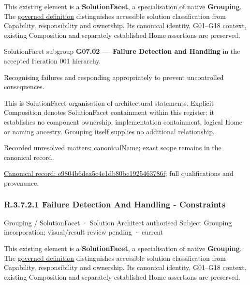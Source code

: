 This existing element is a \textbf{SolutionFacet}, a specialisation of native
\textbf{Grouping}. The \href{\detokenize{../../../../../../../governance/continuum-representation.md#solutionfacet-classification--1119-candidate}}{governed definition}
distinguishes accessible solution classification from Capability, responsibility
and ownership. Its canonical identity, G01–G18 context, existing Composition
and separately established Home assertions are preserved.



SolutionFacet subgroup \textbf{G07.02 — Failure Detection and Handling} in the accepted Iteration 001 hierarchy.



Recognising failures and responding appropriately to prevent uncontrolled consequences.



This is SolutionFacet organisation of architectural statements. Explicit Composition denotes SolutionFacet containment within this register; it establishes no component ownership, implementation containment, logical Home or naming ancestry. Grouping itself supplies no additional relationship.


{\small Recorded unresolved matters: canonicalName; exact scope remains in the canonical record.}\par
{\footnotesize \href{../../../../../../../continuum/grouping/e9804b6dea5c4e1db80be1925463786f.md}{Canonical record: e9804b6dea5c4e1db80be1925463786f}; full qualifications and provenance.}\par
\subsubsection*{R.3.7.2.1 Failure Detection And Handling - Constraints}
\label{navigation:R.3.7.2.1}

\label{element:ee9bc6c96d944f2ea8bbaaeffb31db28}
{\small Grouping / SolutionFacet · Solution Architect authorised Subject Grouping incorporation; visual/result review pending · current}\par

This existing element is a \textbf{SolutionFacet}, a specialisation of native
\textbf{Grouping}. The \href{\detokenize{../../../../../../../governance/continuum-representation.md#solutionfacet-classification--1119-candidate}}{governed definition}
distinguishes accessible solution classification from Capability, responsibility
and ownership. Its canonical identity, G01–G18 context, existing Composition
and separately established Home assertions are preserved.



